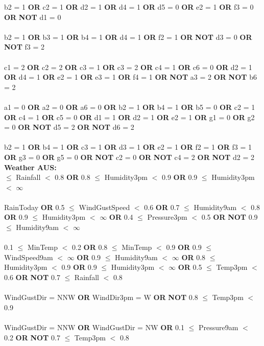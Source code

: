 \noindent b2 = 1 \textbf{OR} c2 = 1 \textbf{OR} d2 = 1 \textbf{OR} d4 = 1 \textbf{OR} d5 = 0 \textbf{OR} e2 = 1 \textbf{OR} f3 = 0 \textbf{OR}  \textbf{NOT} d1 = 0 \\\\b2 = 1 \textbf{OR} b3 = 1 \textbf{OR} b4 = 1 \textbf{OR} d4 = 1 \textbf{OR} f2 = 1 \textbf{OR}  \textbf{NOT} d3 = 0 \textbf{OR}  \textbf{NOT} f3 = 2 \\\\c1 = 2 \textbf{OR} c2 = 2 \textbf{OR} c3 = 1 \textbf{OR} c3 = 2 \textbf{OR} c4 = 1 \textbf{OR} c6 = 0 \textbf{OR} d2 = 1 \textbf{OR} d4 = 1 \textbf{OR} e2 = 1 \textbf{OR} e3 = 1 \textbf{OR} f4 = 1 \textbf{OR}  \textbf{NOT} a3 = 2 \textbf{OR}  \textbf{NOT} b6 = 2 \\\\a1 = 0 \textbf{OR} a2 = 0 \textbf{OR} a6 = 0 \textbf{OR} b2 = 1 \textbf{OR} b4 = 1 \textbf{OR} b5 = 0 \textbf{OR} c2 = 1 \textbf{OR} c4 = 1 \textbf{OR} c5 = 0 \textbf{OR} d1 = 1 \textbf{OR} d2 = 1 \textbf{OR} e2 = 1 \textbf{OR} g1 = 0 \textbf{OR} g2 = 0 \textbf{OR}  \textbf{NOT} d5 = 2 \textbf{OR}  \textbf{NOT} d6 = 2 \\\\b2 = 1 \textbf{OR} b4 = 1 \textbf{OR} c3 = 1 \textbf{OR} d3 = 1 \textbf{OR} e2 = 1 \textbf{OR} f2 = 1 \textbf{OR} f3 = 1 \textbf{OR} g3 = 0 \textbf{OR} g5 = 0 \textbf{OR}  \textbf{NOT} c2 = 0 \textbf{OR}  \textbf{NOT} c4 = 2 \textbf{OR}  \textbf{NOT} d2 = 2 \\

\noindent \textbf{ Weather AUS: }\\

 $\le$ Rainfall $<$ 0.8 \textbf{OR} 0.8 $\le$ Humidity3pm $<$ 0.9 \textbf{OR} 0.9 $\le$ Humidity3pm $<$ $\infty$ \\\\RainToday \textbf{OR} 0.5 $\le$ WindGustSpeed $<$ 0.6 \textbf{OR} 0.7 $\le$ Humidity9am $<$ 0.8 \textbf{OR} 0.9 $\le$ Humidity3pm $<$ $\infty$ \textbf{OR} 0.4 $\le$ Pressure3pm $<$ 0.5 \textbf{OR}  \textbf{NOT} 0.9 $\le$ Humidity9am $<$ $\infty$ \\\\0.1 $\le$ MinTemp $<$ 0.2 \textbf{OR} 0.8 $\le$ MinTemp $<$ 0.9 \textbf{OR} 0.9 $\le$ WindSpeed9am $<$ $\infty$ \textbf{OR} 0.9 $\le$ Humidity9am $<$ $\infty$ \textbf{OR} 0.8 $\le$ Humidity3pm $<$ 0.9 \textbf{OR} 0.9 $\le$ Humidity3pm $<$ $\infty$ \textbf{OR} 0.5 $\le$ Temp3pm $<$ 0.6 \textbf{OR}  \textbf{NOT} 0.7 $\le$ Rainfall $<$ 0.8 \\\\WindGustDir = NNW \textbf{OR} WindDir3pm = W \textbf{OR}  \textbf{NOT} 0.8 $\le$ Temp3pm $<$ 0.9 \\\\WindGustDir = NNW \textbf{OR} WindGustDir = NW \textbf{OR} 0.1 $\le$ Pressure9am $<$ 0.2 \textbf{OR}  \textbf{NOT} 0.7 $\le$ Temp3pm $<$ 0.8 \\

